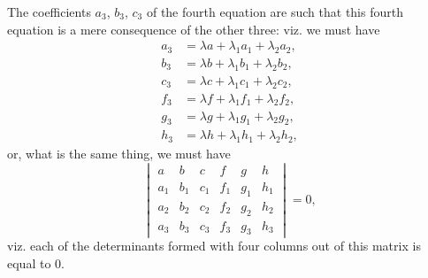 \documentclass[11pt,a4paper]{book}
\begin{document}
The coefficients $a_3$, $b_3$, $c_3$ of the fourth equation are such that this fourth equation is a mere consequence of the other three: viz. we must have
\begin{align*}
a_3 &= \lambda a + \lambda_1 a_1 + \lambda_2 a_2,\\
b_3 &= \lambda b + \lambda_1 b_1 + \lambda_2 b_2,\\
c_3 &= \lambda c + \lambda_1 c_1 + \lambda_2 c_2,\\
f_3 &= \lambda f + \lambda_1 f_1 + \lambda_2 f_2,\\
g_3 &= \lambda g + \lambda_1 g_1 + \lambda_2 g_2,\\
h_3 &= \lambda h + \lambda_1 h_1 + \lambda_2 h_2,
\end{align*}
or, what is the same thing, we must have
\[
\begin{vmatrix}
a & b & c & f & g & h \\
a_1 & b_1 & c_1 & f_1 & g_1 & h_1 \\
a_2 & b_2 & c_2 & f_2 & g_2 & h_2 \\
a_3 & b_3 & c_3 & f_3 & g_3 & h_3
\end{vmatrix} = 0,
\]
viz. each of the determinants formed with four columns out of this matrix is equal to 0.
\end{document}
